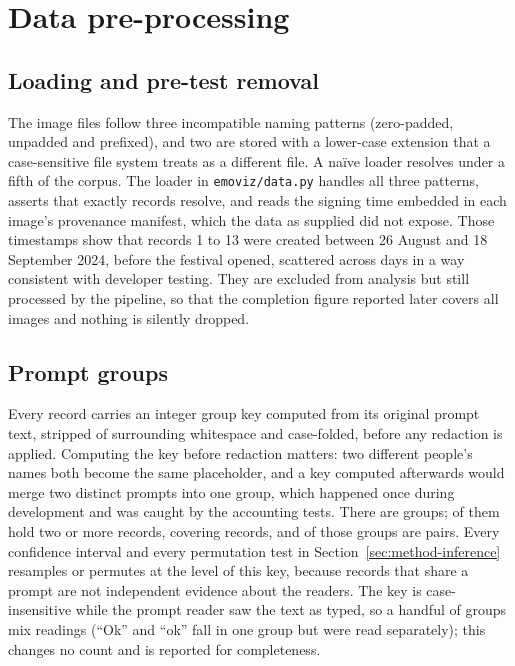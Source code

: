 \section{Data pre-processing}
\label{sec:method-preprocessing}

\subsection{Loading and pre-test removal}

The image files follow three incompatible naming patterns (zero-padded, unpadded and prefixed), and two are stored with a lower-case extension that a case-sensitive file system treats as a different file. A na\"ive loader resolves under a fifth of the corpus. The loader in \texttt{emoviz/data.py} handles all three patterns, asserts that exactly \nTotal{} records resolve, and reads the signing time embedded in each image's provenance manifest, which the data as supplied did not expose. Those timestamps show that records 1 to 13 were created between 26 August and 18 September 2024, before the festival opened, scattered across days in a way consistent with developer testing. They are excluded from analysis but still processed by the pipeline, so that the completion figure reported later covers all \nTotal{} images and nothing is silently dropped.

\subsection{Prompt groups}

Every record carries an integer group key computed from its original prompt text, stripped of surrounding whitespace and case-folded, before any redaction is applied. Computing the key before redaction matters: two different people's names both become the same placeholder, and a key computed afterwards would merge two distinct prompts into one group, which happened once during development and was caught by the accounting tests. There are \nDistinct{} groups; \nGroups{} of them hold two or more records, covering \nGroupRecords{} records, and \nPairGroups{} of those groups are pairs. Every confidence interval and every permutation test in Section~\ref{sec:method-inference} resamples or permutes at the level of this key, because records that share a prompt are not independent evidence about the readers. The key is case-insensitive while the prompt reader saw the text as typed, so a handful of groups mix readings (``Ok'' and ``ok'' fall in one group but were read separately); this changes no count and is reported for completeness.

